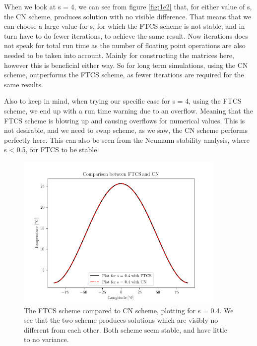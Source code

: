 \documentclass[10pt, a4paper]{amsart}
\begin{document}
When we look at s = 4, we can see from figure \ref{fig:1e2} that, for either value of s, the CN scheme, produces solution with no visible difference. That means that we can choose a large value for s, for which the FTCS scheme is not stable, and in turn have to do fewer iterations, to achieve the same result. Now iterations does not speak for total run time as the number of floating point operations are also needed to be taken into account. Mainly for constructing the matrices here, however this is beneficial either way. So for long term simulations, using the CN scheme, outperforms the FTCS scheme, as fewer iterations are required for the same results. 

Also to keep in mind, when trying our specific case for s = 4, using the FTCS scheme, we end up with a run time warning due to an overflow. Meaning that the FTCS scheme is blowing up and causing overflows for numerical values. This is not desirable, and we need to swap scheme, as we saw, the CN scheme performs perfectly here. This can also be seen from the Neumann stability analysis\cite{lev02}, where s < 0.5, for FTCS to be stable.


\begin{figure}
	\centering\includegraphics[width=0.9\textwidth]{../code/1e1.png}
	\caption{The FTCS scheme compared to CN scheme, plotting for s = 0.4. We see that the two scheme produces solutions which are visibly no different from each other. Both scheme seem stable, and have little to no variance. }
	\label{fig:1e1}
\end{figure}
\end{document}
